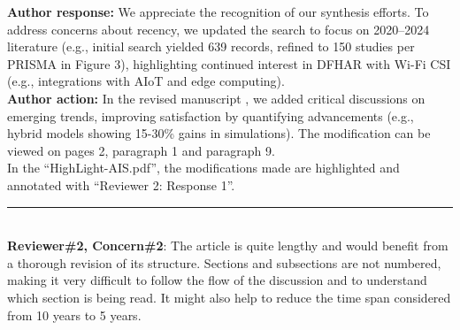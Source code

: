 \documentclass[Afour,sageh,times]{sagej}
\begin{document}
\textbf{Author response:} We appreciate the recognition of our synthesis efforts. To address concerns about recency, we updated the search to focus on 2020–2024 literature (e.g., initial search yielded 639 records, refined to 150 studies per PRISMA in Figure 3), highlighting continued interest in DFHAR with Wi-Fi CSI (e.g., integrations with AIoT and edge computing).\\
\textbf{Author action:} In the revised manuscript , we added critical discussions on emerging trends, improving satisfaction by quantifying advancements (e.g., hybrid models showing 15-30\% gains in simulations). The modification can be viewed on pages 2, paragraph 1 and paragraph 9.\\

\textcolor{myOrange}{
In the “HighLight-AIS.pdf”, the modifications made are highlighted and annotated with “Reviewer 2: Response 1”.  }\\

\color{gray}\rule{\linewidth}{1pt}\normalcolor\\

\textcolor{myGreen}{ \textbf{Reviewer\#2, Concern\#2}: The article is quite lengthy and would benefit from a thorough revision of its structure. Sections and subsections are not numbered, making it very difficult to follow the flow of the discussion and to understand which section is being read. It might also help to reduce the time span considered from 10 years to 5 years.}  \\
 
\end{document}
